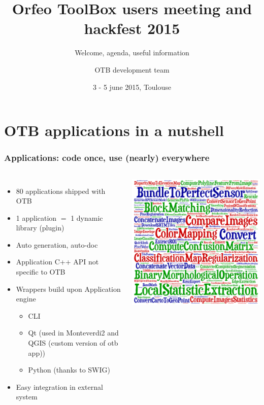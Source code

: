 \documentclass[8pt]{beamer}
\title{Orfeo ToolBox users meeting and hackfest 2015}
\subtitle{Welcome, agenda, useful information}
\author{OTB development team}%
\date{3 - 5 june 2015, Toulouse}
\begin{document}
\begin{frame}
\titlepage
\end{frame}

\section{OTB applications in a nutshell}

\begin{frame}
\frametitle{Applications: code once, use (nearly) everywhere}
\begin{columns}
\begin{itemize}
\item 80 applications shipped with OTB
\item 1 application $=$ 1 dynamic library (plugin)
\item Auto generation, auto-doc
\item Application C++ API not specific to OTB
\item Wrappers build upon Application engine
\begin{itemize}
\item CLI
\item Qt (used in Monteverdi2 and QGIS (custom version of otb app))
\item Python (thanks to SWIG)
\end{itemize}
\item Easy integration in external system 
\end{itemize}
\includegraphics[width=\textwidth]{images/cloud_applications.png}
\end{columns}
\end{frame}
\end{document}
